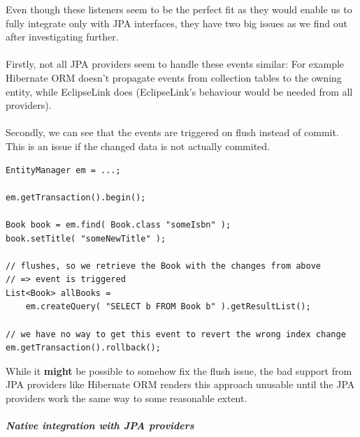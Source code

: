 \noindent
Even though these listeners seem to be the perfect fit as they would enable us to fully integrate only with JPA interfaces, they have two big issues as we find out after investigating further.
\\\\
Firstly, not all JPA providers seem to handle these events similar: For example Hibernate ORM doesn't propagate events from collection tables to the owning entity, while EclipseLink does (EclipseLink's behaviour would be needed from all providers).
\\\\
Secondly, we can see that the events are triggered on flush instead of commit. This is an issue if the changed data is not actually commited.
\\

\lstset{language=java}
\begin{lstlisting}[frame=htrbl, caption={Event triggering on flush}, label={lst:flush_event.java}]
EntityManager em = ...;

em.getTransaction().begin();

Book book = em.find( Book.class "someIsbn" );
book.setTitle( "someNewTitle" );

// flushes, so we retrieve the Book with the changes from above
// => event is triggered
List<Book> allBooks = 
	em.createQuery( "SELECT b FROM Book b" ).getResultList();

// we have no way to get this event to revert the wrong index change
em.getTransaction().rollback();
\end{lstlisting}

\noindent
While it \textbf{might} be possible to somehow fix the flush issue, the bad support from JPA providers like Hibernate ORM renders this approach unusable until the JPA providers work the same way to some reasonable extent.

\subparagraph{Native integration with JPA providers}

